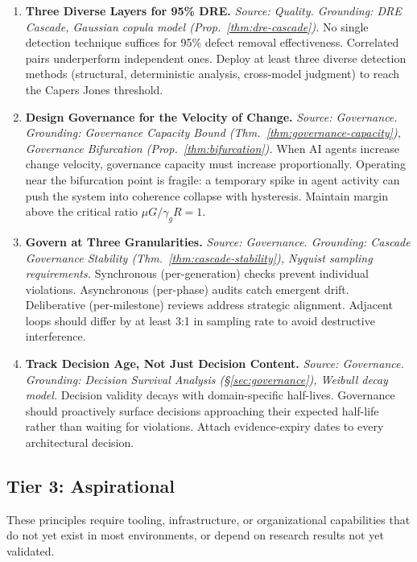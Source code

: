 \documentclass[11pt, a4paper]{googledeepmind}
\begin{document}
\begin{enumerate}[label=\textbf{P\arabic*.}, leftmargin=3em, resume]
\item \textbf{Three Diverse Layers for 95\% DRE.}
\emph{Source: Quality. Grounding: DRE Cascade, Gaussian copula model (Prop.~\ref{thm:dre-cascade}).}
No single detection technique suffices for 95\% defect removal effectiveness. Correlated pairs underperform independent ones. Deploy at least three diverse detection methods (structural, deterministic analysis, cross-model judgment) to reach the Capers Jones threshold.

\item \textbf{Design Governance for the Velocity of Change.}
\emph{Source: Governance. Grounding: Governance Capacity Bound (Thm.~\ref{thm:governance-capacity}), Governance Bifurcation (Prop.~\ref{thm:bifurcation}).}
When AI agents increase change velocity, governance capacity must increase proportionally. Operating near the bifurcation point is fragile: a temporary spike in agent activity can push the system into coherence collapse with hysteresis. Maintain margin above the critical ratio $\mu G / \gamma_g R = 1$.

\item \textbf{Govern at Three Granularities.}
\emph{Source: Governance. Grounding: Cascade Governance Stability (Thm.~\ref{thm:cascade-stability}), Nyquist sampling requirements.}
Synchronous (per-generation) checks prevent individual violations. Asynchronous (per-phase) audits catch emergent drift. Deliberative (per-milestone) reviews address strategic alignment. Adjacent loops should differ by at least 3:1 in sampling rate to avoid destructive interference.

\item \textbf{Track Decision Age, Not Just Decision Content.}
\emph{Source: Governance. Grounding: Decision Survival Analysis (\S\ref{sec:governance}), Weibull decay model.}
Decision validity decays with domain-specific half-lives. Governance should proactively surface decisions approaching their expected half-life rather than waiting for violations. Attach evidence-expiry dates to every architectural decision.

\end{enumerate}

\subsection{Tier 3: Aspirational}
\label{sec:tier3}

These principles require tooling, infrastructure, or organizational capabilities that do not yet exist in most environments, or depend on research results not yet validated.
\end{document}
